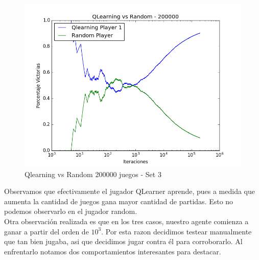 \begin{figure}[h]
 \centering
 \begin{minipage}{.45\textwidth}
	\centering
	\includegraphics[scale=0.35]{img1/QlearningVsRandom_200000_6x5_cyntia.png}
        \caption{Qlearning vs Random 200000 juegos - Set 3}
  \end{minipage}
\end{figure}



Observamos que efectivamente el jugador QLearner aprende, pues a medida que aumenta la cantidad de juegos gana mayor cantidad de partidas. Esto no podemos
observarlo en el jugador random.  \\

Otra observación realizada es que en los tres casos, nuestro agente comienza a ganar a partir del orden de $10^{3}$. Por esta razon decidimos testear manualmente que tan bien jugaba,
asi que decidimos jugar contra él para corroborarlo. Al enfrentarlo notamos dos comportamientos interesantes para destacar.

